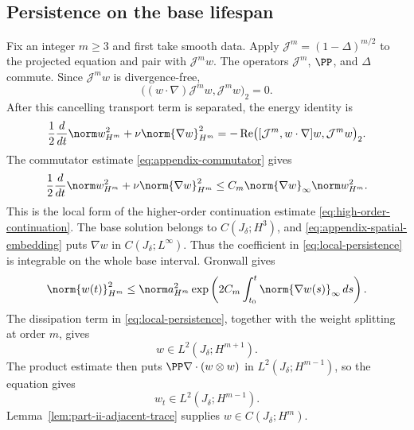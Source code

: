 \subsection{Persistence on the base lifespan}

Fix an integer \(m\ge3\) and first take smooth data.
Apply \(\mathcal J^m=(1-\Delta)^{m/2}\) to the projected equation and pair with \(\mathcal J^mw\).
The operators \(\mathcal J^m\), \(\PP\), and \(\Delta\) commute.
Since \(\mathcal J^mw\) is divergence-free,
\[
 \bigl((w\cdot\nabla)\mathcal J^mw,\mathcal J^mw\bigr)_2=0.
\]
After this cancelling transport term is separated, the energy identity is
\[
 \frac12\frac d{dt}\norm w_{H^m}^2
 +\nu\norm{\nabla w}_{H^m}^2
 =-\operatorname{Re}
 \bigl([\mathcal J^m,w\cdot\nabla]w,\mathcal J^mw\bigr)_2.
\]
The commutator estimate \eqref{eq:appendix-commutator} gives
\begin{equation}
 \frac12\frac d{dt}\norm w_{H^m}^2
 +\nu\norm{\nabla w}_{H^m}^2
 \le C_m\norm{\nabla w}_\infty\norm w_{H^m}^2.
 \label{eq:local-persistence}
\end{equation}
This is the local form of the higher-order continuation estimate \eqref{eq:high-order-continuation}.
The base solution belongs to \(C(J_\delta;H^3)\), and \eqref{eq:appendix-spatial-embedding} puts \(\nabla w\) in \(C(J_\delta;L^\infty)\).
Thus the coefficient in \eqref{eq:local-persistence} is integrable on the whole base interval.
Gronwall gives
\begin{equation}
 \norm{w(t)}_{H^m}^2
 \le\norm a_{H^m}^2
 \exp\left(
 2C_m\int_{t_0}^{t}\norm{\nabla w(s)}_\infty\,ds
 \right).
 \label{eq:local-persistence-bound}
\end{equation}
The dissipation term in \eqref{eq:local-persistence}, together with the weight splitting at order \(m\), gives
\[
 w\in L^2(J_\delta;H^{m+1}).
\]
The product estimate then puts \(\PP\nabla\cdot(w\otimes w)\) in \(L^2(J_\delta;H^{m-1})\), so the equation gives
\[
 w_t\in L^2(J_\delta;H^{m-1}).
\]
Lemma~\ref{lem:part-ii-adjacent-trace} supplies \(w\in C(J_\delta;H^m)\).

